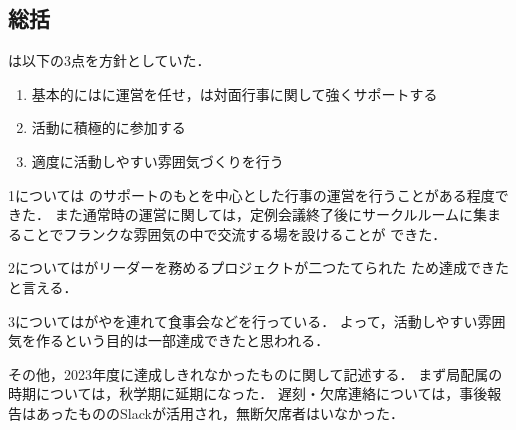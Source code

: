 \subsection*{\thirdGrade{}総括}

\thirdGrade{}は以下の3点を方針としていた．

\begin{enumerate}
  \item 基本的には\secondGrade{}に運営を任せ，\thirdGrade{}は対面行事に関して強くサポートする
  \item 活動に積極的に参加する
  \item 適度に活動しやすい雰囲気づくりを行う
\end{enumerate}


1については
\thirdGrade{}のサポートのもと\secondGrade{}を中心とした行事の運営を行うことがある程度できた．
また通常時の運営に関しては，定例会議終了後にサークルルームに集まることでフランクな雰囲気の中で交流する場を設けることが
できた．

2については\thirdGrade{}がリーダーを務めるプロジェクトが二つたてられた
ため達成できたと言える．

3については\thirdGrade{}が\firstGrade{}や\secondGrade{}を連れて食事会などを行っている．
よって，活動しやすい雰囲気を作るという目的は一部達成できたと思われる．


その他，2023年度に達成しきれなかったものに関して記述する．
まず局配属の時期については，秋学期に延期になった．
遅刻・欠席連絡については，事後報告はあったもののSlackが活用され，無断欠席者はいなかった．
